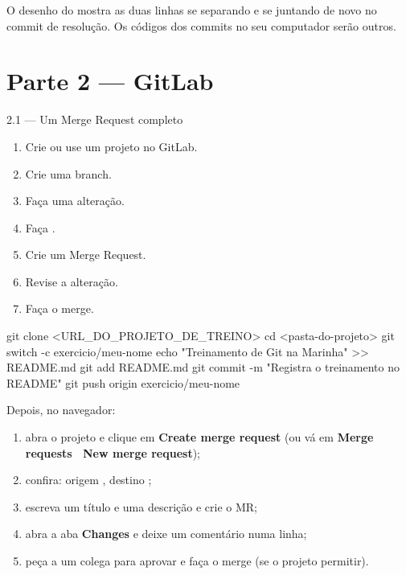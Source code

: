 \begin{verifique}
O desenho do  mostra as duas linhas se separando e se juntando de novo no commit de resolução. Os códigos dos commits no seu computador serão outros.
\end{verifique}

\section{Parte 2 — GitLab}

\begin{exercicio}{2.1 — Um Merge Request completo}
\begin{enumerate}
  \item Crie ou use um projeto no GitLab.
  \item Crie uma branch.
  \item Faça uma alteração.
  \item Faça .
  \item Crie um Merge Request.
  \item Revise a alteração.
  \item Faça o merge.
\end{enumerate}
\end{exercicio}

\begin{terminal}
git clone <URL_DO_PROJETO_DE_TREINO>
cd <pasta-do-projeto>
git switch -c exercicio/meu-nome
echo "Treinamento de Git na Marinha" >> README.md
git add README.md
git commit -m "Registra o treinamento no README"
git push origin exercicio/meu-nome
\end{terminal}

Depois, no navegador:

\begin{enumerate}
  \item abra o projeto e clique em \textbf{Create merge request} (ou vá em \textbf{Merge requests \faChevronRight\ New merge request});
  \item confira: origem , destino ;
  \item escreva um título e uma descrição e crie o MR;
  \item abra a aba \textbf{Changes} e deixe um comentário numa linha;
  \item peça a um colega para aprovar e faça o merge (se o projeto permitir).
\end{enumerate}

